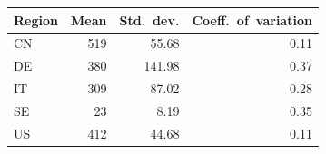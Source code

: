 \begin{tabular}{lrrr}
\toprule
Region & Mean & Std.\ dev. & Coeff.\ of\ variation \\
\midrule
CN & 519 & 55.68 & 0.11 \\
DE & 380 & 141.98 & 0.37 \\
IT & 309 & 87.02 & 0.28 \\
SE & 23 & 8.19 & 0.35 \\
US & 412 & 44.68 & 0.11 \\
\bottomrule
\end{tabular}
